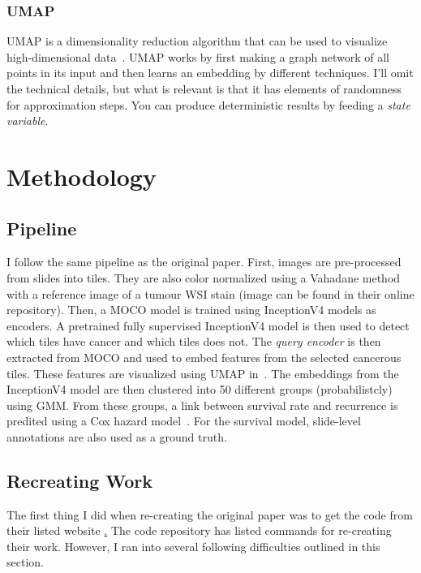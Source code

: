 \documentclass[10pt,twocolumn,letterpaper]{article}
\begin{document}
\subsubsection{UMAP}\label{subsubsec:umap}
\gls{UMAP} is a dimensionality reduction algorithm that can be used to visualize high-dimensional data~\cite{umap}. \gls{UMAP} works by first making a graph network of all points in its input and then learns an embedding by different techniques. I'll omit the technical details, but what is relevant is that it has elements of randomness for approximation steps. You can produce deterministic results by feeding a \textit{state variable}.


\section{Methodology}\label{sec:methodology}
\subsection{Pipeline}
I follow the same pipeline as the original paper. First, images are pre-processed from slides into tiles. They are also color normalized using a Vahadane method~\cite{vahadane} with a reference image of a tumour WSI stain (image can be found in their online repository). Then, a \gls{MOCO} model is trained using InceptionV4 models as encoders. A pretrained fully supervised InceptionV4 model is then used to detect which tiles have cancer and which tiles does not. The \textit{query encoder} is then extracted from \gls{MOCO} and used to embed features from the selected cancerous tiles. These features are visualized using \gls{UMAP} in~. The embeddings from the InceptionV4 model are then clustered into 50 different groups (probabilistcly) using \gls{GMM}. From these groups, a link between survival rate and recurrence is predited using a Cox hazard model~\cite{cox1972regression}. For the survival model, slide-level annotations are also used as a ground truth.

\subsection{Recreating Work}
The first thing I did when re-creating the original paper was to get the code from their listed website \href{https://github.com/NYUMedML/conditional_ssl_hist}. The code repository has listed commands for re-creating their work. However, I ran into several following difficulties outlined in this section.
\end{document}
